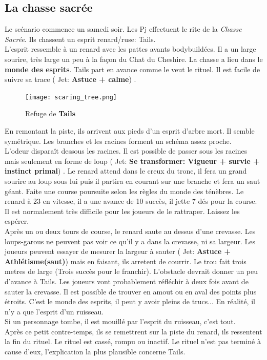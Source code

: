 \documentclass[oneside,12pt]{book}
\newcommand\roll[1]{
( Jet: \textbf{#1})
}
\begin{document}
\begin{flushleft}
\section{La chasse sacrée}
Le scénario commence un samedi soir.
Les Pj effectuent le rite de la \textit{Chasse Sacrée}. Ils chassent un esprit renard/ruse: Tails. \\
L'esprit ressemble à un renard avec les pattes avants bodybuildées. Il a un large sourire, très large un peu à la façon du Chat du Cheshire. La chasse a lieu dans le \textbf{monde des esprits}. Tails part en avance comme le veut le rituel. Il est facile de suivre sa trace \roll{Astuce + calme}.\\
\begin{figure}[!h]
\caption{\label{arbre_mort} Refuge de \textbf{Tails}}
\texttt{[image: scaring\_tree.png]}
\end{figure}
En remontant la piste, ils arrivent aux pieds d'un esprit d'arbre mort. Il semble symétrique. Les branches et les racines forment un schéma assez proche.\\ 
L'odeur disparaît dessous les racines. Il est possible de passer sous les racines mais seulement en forme de loup \roll{Se transformer: Vigueur + survie + instinct primal}. 
Le renard attend dans le creux du tronc, il fera un grand sourire au loup sous lui puis il partira en courant sur une branche et fera un saut géant. 
Faite une course poursuite selon les règles du monde des ténèbres. Le renard à 23 en vitesse, il a une avance de 10 succès, il jette 7 dés pour la course. Il est normalement très difficile pour les joueurs de le rattraper. 
Laissez les espérer.\\ 
Après un ou deux tours de course, le renard saute au dessus d'une crevasse. 
Les loups-garous ne peuvent pas voir ce qu'il y a dans la crevasse, ni sa largeur. Les joueurs peuvent essayer de mesurer la largeur à sauter \roll{Astuce + Athlétisme(saut)} mais en faisant, ils arretent de courrir. 
Le trou fait trois metres de large (Trois succès pour le franchir). 
L'obstacle devrait donner un peu d'avance à Tails. 
Les joueurs vont probablement réfléchir à deux fois avant de sauter la crevasse. Il est possible de trouver en amout ou en aval des points plus étroits.
C'est le monde des esprits, il peut y avoir pleins de trucs... En réalité, il n'y a que l'esprit d'un ruisseau. \\ 

Si un personnage tombe, il est mouillé par l'esprit du ruisseau, c'est tout.\\
Après ce petit contre-temps, ils se remettrent sur la piste du renard, ils ressentent la fin du rituel. Le rituel est cassé, rompu ou inactif. Le rituel n'est pas terminé à cause d'eux, l'explication la plus plausible concerne Tails.


\end{flushleft}
\end{document}
